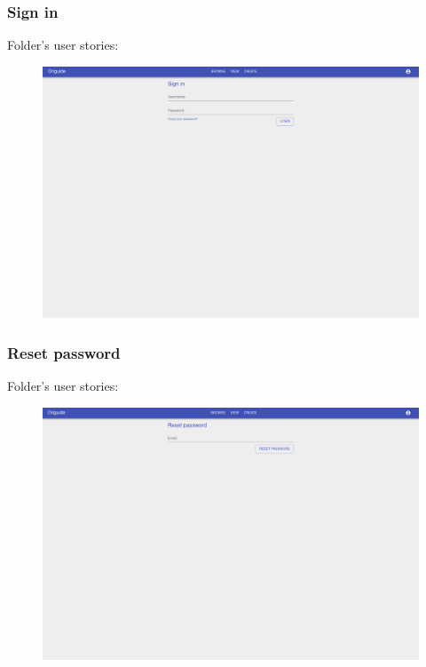 \subsubsection{Sign in}

Folder's user stories:
\begin{enumerate}
	\setcounter{enumi}{16}
\end{enumerate}

\begin{figure}[H]
  	\centering
    \includegraphics[width=\textwidth]{assets/5-signIn.png}
\end{figure}

\subsubsection{Reset password}

Folder's user stories:
\begin{enumerate}
	\setcounter{enumi}{17}
\end{enumerate}

\begin{figure}[H]
  	\centering
    \includegraphics[width=\textwidth]{assets/5-passwordResetForm.png}
\end{figure}

